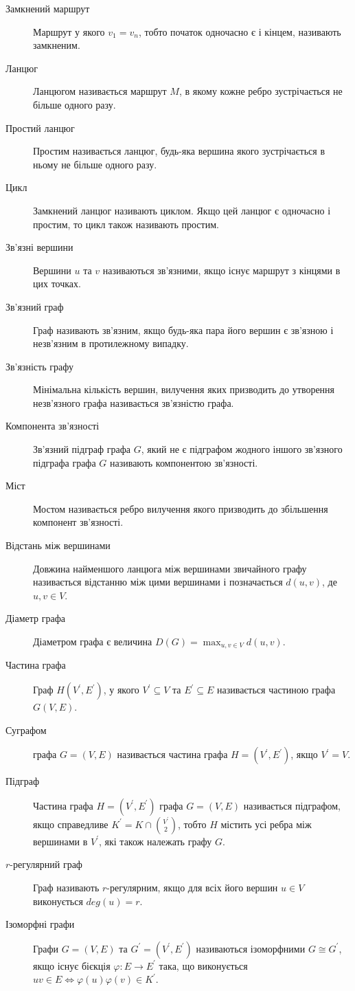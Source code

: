 \begin{description}
\item[Замкнений маршрут] Маршрут у якого $v_1=v_n$, тобто початок одночасно є і кінцем, називають замкненим.
\item[Ланцюг] Ланцюгом називається маршрут $M$, в якому кожне ребро зустрічається не більше одного разу.
\item[Простий ланцюг] Простим називається ланцюг, будь-яка вершина якого зустрічається в ньому не більше одного разу.
\item[Цикл] Замкнений ланцюг називають циклом. Якщо цей ланцюг є одночасно і простим, то цикл також називають простим.
\item[Зв'язні вершини] Вершини $u$ та $v$ називаються зв'язними, якщо існує маршрут з кінцями в цих точках.
\item[Зв'язний граф] Граф називають зв'язним, якщо будь-яка пара його вершин є зв'язною і незв'язним в протилежному випадку.
\item[Зв'язність графу] Мінімальна кількість вершин, вилучення яких призводить до утворення незв'язного графа називається зв'язністю графа.
\item[Компонента зв'язності] Зв'язний підграф графа $G$, який не є підграфом жодного іншого зв'язного підграфа графа $G$ називають компонентою зв'язності.
\item[Міст] Мостом називається ребро вилучення якого призводить до збільшення компонент зв'язності.
\item[Відстань між вершинами] Довжина найменшого ланцюга між вершинами звичайного графу називається відстанню між цими вершинами і позначається $d(u,v)$, де $u,v \in V$.
\item[Діаметр графа] Діаметром графа є величина $D(G) = \displaystyle{\max_{u,v \in V}d(u,v)}$.
\item[Частина графа] Граф $H(V^\prime,E^\prime)$, у якого $V^\prime \subseteq V$ та $E^\prime \subseteq E$ називається частиною графа $G(V,E)$.
\item[Суграфом] графа $G=(V,E)$ називається частина графа $H=(V^\prime,E^\prime)$, якщо $V^\prime=V$.
\item[Підграф] Частина графа $H=(V^\prime,E^\prime)$ графа $G=(V,E)$ називається підграфом, якщо справедливе $K^\prime=K\cap {V^\prime \choose 2}$, тобто $H$ містить усі ребра між вершинами в $V^\prime$, які також належать графу $G$.
\item[$r$-регулярний граф] Граф називають $r$-регулярним, якщо для всіх його вершин $u \in V$ виконується $deg(u)=r$.
\item[Ізоморфні графи] Графи $G = (V,E)$ та $G^\prime = (V^\prime,E^\prime)$ називаються ізоморфними $G \cong G^\prime$, якщо існує бієкція $\varphi : E \to E^\prime$ така, що виконується $uv \in E \Leftrightarrow \varphi (u)\varphi (v) \in K^\prime$.
\end{description}
